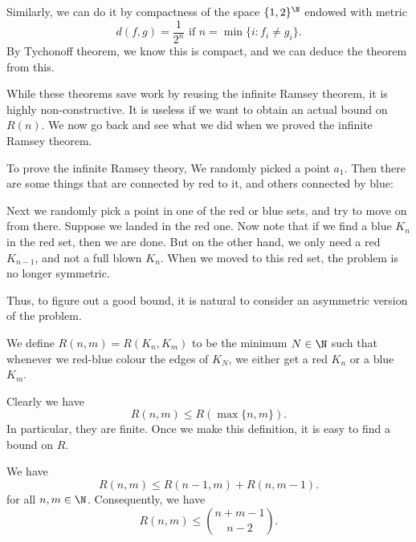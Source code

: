 \documentclass[a4paper]{article}
\begin{document}
Similarly, we can do it by compactness of the space $\{1, 2\}^\N$ endowed with metric
\[
  d(f, g) = \frac{1}{2^n}\text{ if } n = \min \{i: f_i \not= g_i\}.
\]
By Tychonoff theorem, we know this is compact, and we can deduce the theorem from this. %

While these theorems save work by reusing the infinite Ramsey theorem, it is highly non-constructive. It is useless if we want to obtain an actual bound on $R(n)$. We now go back and see what we did when we proved the infinite Ramsey theorem.

To prove the infinite Ramsey theory, We randomly picked a point $a_1$. Then there are some things that are connected by red to it, and others connected by blue:
\begin{center}
\end{center}
Next we randomly pick a point in one of the red or blue sets, and try to move on from there. Suppose we landed in the red one. Now note that if we find a blue $K_n$ in the red set, then we are done. But on the other hand, we only need a red $K_{n - 1}$, and not a full blown $K_n$. When we moved to this red set, the problem is no longer symmetric.

Thus, to figure out a good bound, it is natural to consider an asymmetric version of the problem.
\begin{defi}
  We define $R(n, m) = R(K_n, K_m)$ to be the minimum $N \in \N$ such that whenever we red-blue colour the edges of $K_N$, we either get a red $K_n$ or a blue $K_m$.
\end{defi}

Clearly we have
\[
  R(n, m) \leq R(\max\{n, m\}).
\]
In particular, they are finite. Once we make this definition, it is easy to find a bound on $R$.
\begin{thm}
  We have
  \[
    R(n, m) \leq R(n - 1, m) + R(n, m - 1).
  \]
  for all $n, m \in \N$. Consequently, we have
  \[
    R(n, m) \leq \binom{n + m - 1}{n - 2}.
  \]
\end{thm}
\end{document}
